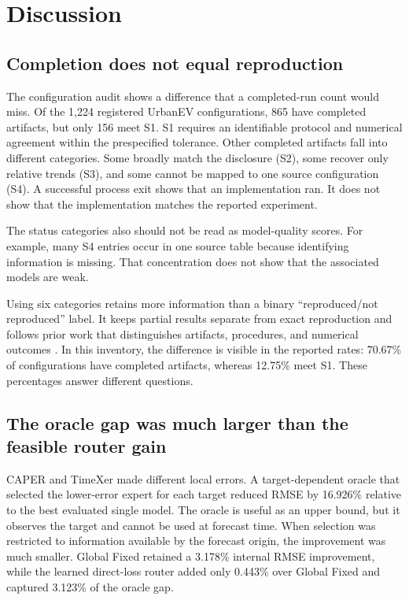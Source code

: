 \section{Discussion}
\label{sec:discussion}

\subsection{Completion does not equal reproduction}

The configuration audit shows a difference that a completed-run count would miss.  Of the 1,224 registered UrbanEV configurations, 865 have completed artifacts, but only 156 meet S1.  S1 requires an identifiable protocol and numerical agreement within the prespecified tolerance.  Other completed artifacts fall into different categories.  Some broadly match the disclosure (S2), some recover only relative trends (S3), and some cannot be mapped to one source configuration (S4).  A successful process exit shows that an implementation ran.  It does not show that the implementation matches the reported experiment.

The status categories also should not be read as model-quality scores.  For example, many S4 entries occur in one source table because identifying information is missing.  That concentration does not show that the associated models are weak.

Using six categories retains more information than a binary ``reproduced/not reproduced'' label.  It keeps partial results separate from exact reproduction and follows prior work that distinguishes artifacts, procedures, and numerical outcomes \cite{pineau2021reproducibility,bouthillier2021variance}.  In this inventory, the difference is visible in the reported rates: 70.67\% of configurations have completed artifacts, whereas 12.75\% meet S1.  These percentages answer different questions.

\subsection{The oracle gap was much larger than the feasible router gain}

CAPER and TimeXer made different local errors.  A target-dependent oracle that selected the lower-error expert for each target reduced RMSE by 16.926\% relative to the best evaluated single model.  The oracle is useful as an upper bound, but it observes the target and cannot be used at forecast time.  When selection was restricted to information available by the forecast origin, the improvement was much smaller.  Global Fixed retained a 3.178\% internal RMSE improvement, while the learned direct-loss router added only 0.443\% over Global Fixed and captured 3.123\% of the oracle gap.

